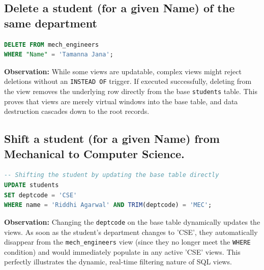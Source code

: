\documentclass[11pt, a4paper]{article}
\begin{document}
\subsection*{Delete a student (for a given Name) of the same department}
\begin{lstlisting}[language=SQL]
DELETE FROM mech_engineers 
WHERE "Name" = 'Tamanna Jana';
\end{lstlisting}
\vspace{0.2cm}
\textbf{Observation:} While some views are updatable, complex views might reject deletions without an \texttt{INSTEAD OF} trigger. If executed successfully, deleting from the view removes the underlying row directly from the base \texttt{students} table. This proves that views are merely virtual windows into the base table, and data destruction cascades down to the root records.
\vspace{0.3cm}

\subsection*{Shift a student (for a given Name) from Mechanical to Computer Science.}
\begin{lstlisting}[language=SQL]
-- Shifting the student by updating the base table directly
UPDATE students 
SET deptcode = 'CSE' 
WHERE name = 'Riddhi Agarwal' AND TRIM(deptcode) = 'MEC';
\end{lstlisting}
\vspace{0.2cm}
\textbf{Observation:} Changing the \texttt{deptcode} on the base table dynamically updates the views. As soon as the student's department changes to 'CSE', they automatically disappear from the \texttt{mech\_engineers} view (since they no longer meet the \texttt{WHERE} condition) and would immediately populate in any active 'CSE' views. This perfectly illustrates the dynamic, real-time filtering nature of SQL views.
\vspace{0.3cm}
\end{document}
